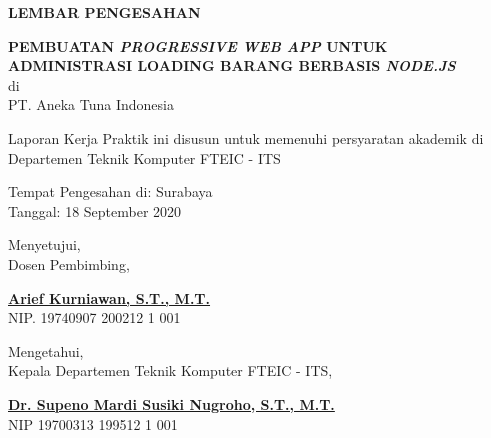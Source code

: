\begin{center}
  {\Large \textbf{LEMBAR PENGESAHAN}}
  \vspace{4ex}


  {\large \textbf{PEMBUATAN \emph{PROGRESSIVE WEB APP} UNTUK ADMINISTRASI LOADING BARANG BERBASIS \emph{NODE.JS}}} \\
  di \\
  PT. Aneka Tuna Indonesia
  \vspace{4ex}

  Laporan Kerja Praktik ini disusun untuk memenuhi persyaratan akademik di Departemen Teknik Komputer FTEIC - ITS
  \vspace{2ex}

  Tempat Pengesahan di: Surabaya \\
  Tanggal: 18 September 2020
  \vspace{8ex}

  Menyetujui, \\
  Dosen Pembimbing,
  \vspace{12ex}

  \textbf{\underline{Arief Kurniawan, S.T., M.T.}} \\
  NIP. 19740907 200212 1 001
  \vspace{8ex}

  Mengetahui, \\
  Kepala Departemen Teknik Komputer FTEIC - ITS,
  \vspace{12ex}

  \textbf{\underline{Dr. Supeno Mardi Susiki Nugroho, S.T., M.T.}} \\
  NIP 19700313 199512 1 001

\end{center}